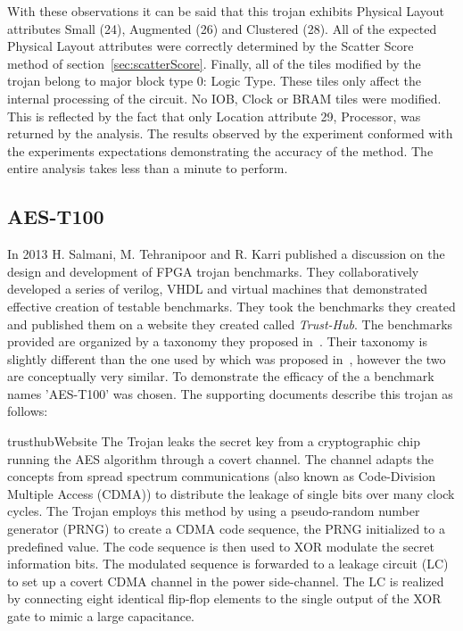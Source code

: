 With these observations it can be said that this trojan exhibits Physical Layout attributes Small (24), Augmented (26) and Clustered (28). 
All of the expected Physical Layout attributes were correctly determined by the Scatter Score method of section~\ref{sec:scatterScore}.
Finally, all of the tiles modified by the trojan belong to major block type 0: Logic Type.
These tiles only affect the internal processing of the circuit.
No \acrshort{IOB}, Clock or \acrshort{BRAM} tiles were modified.
This is reflected by the fact that only Location attribute 29, Processor, was returned by the analysis.
The results observed by the experiment conformed with the experiments expectations demonstrating the accuracy of the method.
The entire analysis takes less than a minute to perform.
\subsection{AES-T100} \label{sec:aesT100}
In 2013 H. Salmani, M. Tehranipoor and R. Karri published a discussion on the design and development of \acrshort{FPGA} trojan benchmarks.
They collaboratively developed a series of verilog, VHDL and virtual machines that demonstrated effective creation of testable benchmarks.
They took the benchmarks they created and published them on a website they created called \textit{Trust-Hub}.
The benchmarks provided are organized by a taxonomy they proposed in~\cite{trustHubPaper}.
Their taxonomy is slightly different than the one used by \NameNoPeriod which was proposed in~\cite{samerAttribute}, however the two are conceptually very similar.
To demonstrate the efficacy of the \NameNoPeriod a benchmark names 'AES-T100' was chosen. 
The supporting documents describe this trojan as follows:
\begin{displaycquote}{trusthubWebsite}
	The Trojan leaks the secret key from a cryptographic chip running the AES algorithm through a covert channel. The channel adapts the concepts from spread spectrum communications (also known as Code-Division Multiple Access (CDMA)) to distribute the leakage of single bits over many clock cycles. The Trojan employs this method by using a pseudo-random number generator (PRNG) to create a CDMA code sequence, the PRNG initialized to a predefined value. The code sequence is then used to XOR modulate the secret information bits. The modulated sequence is forwarded to a leakage circuit (LC) to set up a covert CDMA channel in the power side-channel. The LC is realized by connecting eight identical flip-flop elements to the single output of the XOR gate to mimic a large capacitance.
\end{displaycquote}

